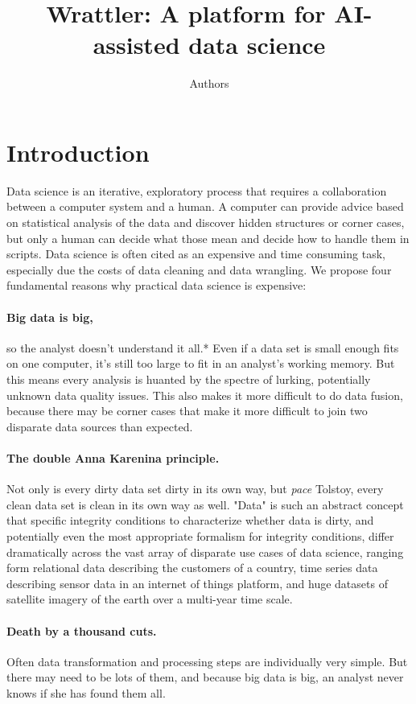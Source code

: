 \documentclass[sigplan,preprint,10pt]{acmart}\settopmatter{printfolios=true,printccs=false,printacmref=false}
\title{Wrattler: \textnormal{A platform for AI-assisted data science}}
\author{Authors}
\theoremstyle{plain}
\theoremstyle{definition}
\begin{document}
\maketitle

\section{Introduction}
Data science is an iterative, exploratory process that requires a collaboration between a
computer system and a human. A computer can provide advice based on statistical analysis of the
data and discover hidden structures or corner cases, but only a human can decide what those mean
and decide how to handle them in scripts. Data science is often cited as an expensive
and time consuming task, especially due the costs of data cleaning and data wrangling.
We propose four fundamental reasons why
practical data science is expensive:

\paragraph{Big data is big,}
so the analyst doesn't understand it all.*
Even if a data set is small enough fits on one computer, it's still too large to fit in
an analyst's working memory.
But this means every analysis is huanted
by the spectre of lurking, potentially
unknown data quality  issues.
This also makes it more difficult to do data fusion, because there may be corner cases that make it more difficult to join two disparate data sources than expected.

\paragraph{The double Anna Karenina principle.}
Not only is every dirty data set  dirty in its own way, but \emph{pace} Tolstoy, every clean data set is clean in its own way as well.
"Data" is such an abstract concept that specific integrity conditions to characterize whether data is dirty, and potentially even the most appropriate formalism for integrity conditions,  differ dramatically across
the vast array of disparate use cases of data science,
ranging form relational data describing the customers of a country, time series data describing sensor data in an internet of things platform, and huge datasets of satellite imagery of the earth over a multi-year time scale.

\paragraph{Death by a thousand cuts.}
Often data transformation and processing steps are individually  very simple. But  there may need to be lots of them, and
because big data is big,
an analyst never knows if she has found them all.
\end{document}
